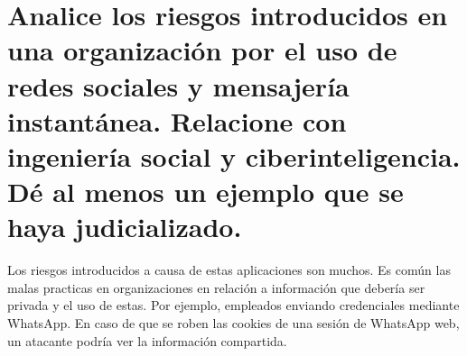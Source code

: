 \documentclass{article}
\begin{document}
	\section{Analice los riesgos introducidos en una organización por el uso de redes sociales y mensajería instantánea. Relacione con ingeniería social y ciberinteligencia. Dé al menos un ejemplo que se haya judicializado.}
	
	Los riesgos introducidos a causa de estas aplicaciones son muchos. Es común las malas practicas en organizaciones en relación a información que debería ser privada y el uso de estas. Por ejemplo, empleados enviando credenciales mediante WhatsApp. En caso de que se roben las cookies de una sesión de WhatsApp web, un atacante podría ver la información compartida.
	
	
	
	
	
\end{document}
